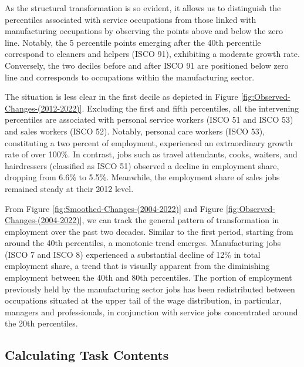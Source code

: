 \begin{onehalfspace}
As the structural transformation is so evident, it allows us to distinguish
the percentiles associated with service occupations from those linked
with manufacturing occupations by observing the points above and below
the zero line. Notably, the 5 percentile points emerging after the
40th percentile correspond to cleaners and helpers (ISCO 91), exhibiting
a moderate growth rate. Conversely, the two deciles before and after
ISCO 91 are positioned below zero line and corresponds to occupations
within the manufacturing sector.

The situation is less clear in the first decile as depicted in Figure
\ref{fig:Observed-Changes-(2012-2022)}. Excluding the first and fifth
percentiles, all the intervening percentiles are associated with personal
service workers (ISCO 51 and ISCO 53) and sales workers (ISCO 52).
Notably, personal care workers (ISCO 53), constituting a two percent
of employment, experienced an extraordinary growth rate of over 100\%.
In contrast, jobs such as travel attendants, cooks, waiters, and hairdressers
(classified as ISCO 51) observed a decline in employment share, dropping
from 6.6\% to 5.5\%. Meanwhile, the employment share of sales jobs
remained steady at their 2012 level.

From Figure \ref{fig:Smoothed-Changes-(2004-2022)} and Figure \ref{fig:Observed-Changes-(2004-2022)},
we can track the general pattern of transformation in employment over
the past two decades. Similar to the first period, starting from around
the 40th percentiles, a monotonic trend emerges. Manufacturing jobs
(ISCO 7 and ISCO 8) experienced a substantial decline of 12\% in total
employment share, a trend that is visually apparent from the diminishing
employment between the 40th and 80th percentiles. The portion of employment
previously held by the manufacturing sector jobs has been redistributed
between occupations situated at the upper tail of the wage distribution,
in particular, managers and professionals, in conjunction with service
jobs concentrated around the 20th percentiles.
\end{onehalfspace}

\subsection{Calculating Task Contents}


